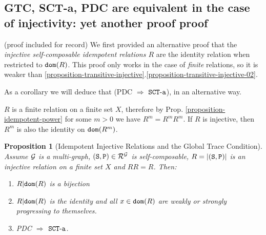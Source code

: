 \documentclass{lmcs}
\newtheorem{proposition}[theorem]{Proposition}
\begin{document}
\subsection{GTC, SCT-a, PDC  are equivalent in the case of injectivity: 
yet another proof proof}
(proof included for record)
\label{subsection-SCT-PDC-old}
We first provided an alternative proof that 
the \emph{injective self-composable idempotent relations $R$} are the identity relation when 
restricted to ${\tt dom}(R)$. This proof only works in the case of \emph{finite} relations,
so it is weaker than 
\ref{proposition-transitive-injective}.\ref{proposition-transitive-injective-02}.

As a corollary we will deduce that (PDC $\Rightarrow$ ${\tt SCT\mbox{-}a}$), in an alternative way.

$R$ is a finite relation on a finite set $X$, therefore by Prop. 
\ref{proposition-idempotent-power} for some $m>0$ we have $R^m=R^mR^m$. 
If $R$ is injective, then $R^m$ is also the identity on ${\tt dom}(R^m)$.


\begin{proposition}[Idempotent Injective Relations
and the Global Trace Condition]
\label{proposition-idempotent-relations}
Assume ${\mathcal G}$ is a multi-graph, $({\tt S},{\tt P}) \in {\mathcal R}^{\mathcal G}$ is self-composable, 
$R = {| ({\tt S},{\tt P}) |}$ is an \emph{injective} relation on a finite set $X$ and $RR=R$. 
Then:
\begin{enumerate}

\item
$R {|} {\tt dom}(R) $ is a bijection

\item
$R {|} {\tt dom}(R) $ is the identity and all
$x \in {\tt dom}(R)$ are weakly or strongly progressing to themselves.

\item
PDC $\Rightarrow$ ${\tt SCT\mbox{-}a}$.
\end{enumerate}
\end{proposition}
\end{document}

